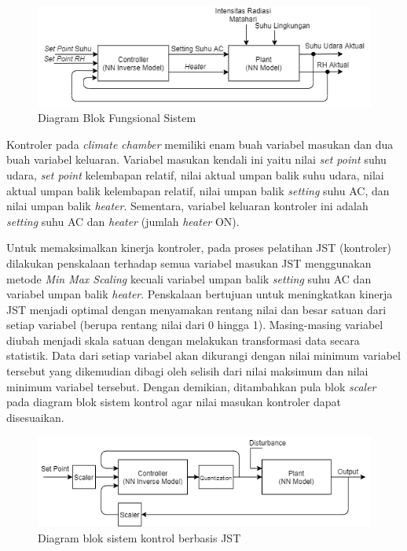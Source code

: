 \begin{figure}[!h]
	\centering
	\includegraphics[width=1\textwidth]{figures/DiagramBlokFungsionalSistem}
	\caption{Diagram Blok Fungsional Sistem}
	\label{fig:5:DiagramBlokSistem}
\end{figure}

Kontroler pada \textit{climate chamber} memiliki enam buah variabel masukan dan dua buah variabel keluaran. Variabel masukan kendali ini yaitu nilai \textit{set point} suhu udara, \textit{set point} kelembapan relatif, nilai aktual umpan balik suhu udara, nilai aktual umpan balik kelembapan relatif, nilai umpan balik \textit{setting} suhu AC, dan nilai umpan balik \textit{heater}. Sementara, variabel keluaran kontroler ini adalah \textit{setting} suhu AC dan \textit{heater} (jumlah \textit{heater} ON).

Untuk memaksimalkan kinerja kontroler, pada proses pelatihan JST (kontroler) dilakukan penskalaan terhadap semua variabel masukan JST menggunakan metode \textit{Min Max Scaling} kecuali variabel umpan balik \textit{setting} suhu AC dan variabel umpan balik \textit{heater}. Penskalaan bertujuan untuk meningkatkan kinerja JST menjadi optimal dengan menyamakan rentang nilai dan besar satuan dari setiap variabel (berupa rentang nilai dari 0 hingga 1). Masing-masing variabel diubah menjadi skala satuan dengan melakukan transformasi data secara statistik. Data dari setiap variabel akan dikurangi dengan nilai minimum variabel tersebut yang dikemudian dibagi oleh selisih dari nilai maksimum dan nilai minimum variabel tersebut. Dengan demikian, ditambahkan pula blok \textit{scaler} pada diagram blok sistem kontrol agar nilai masukan kontroler dapat disesuaikan.

\begin{figure}[!h]
	\centering
	\includegraphics[width=1\textwidth]{figures/ControlDesignDiagramII}
	\caption{Diagram blok sistem kontrol berbasis JST}
	\label{fig:5:ConstrolSystemBlockDiagram}
\end{figure}

